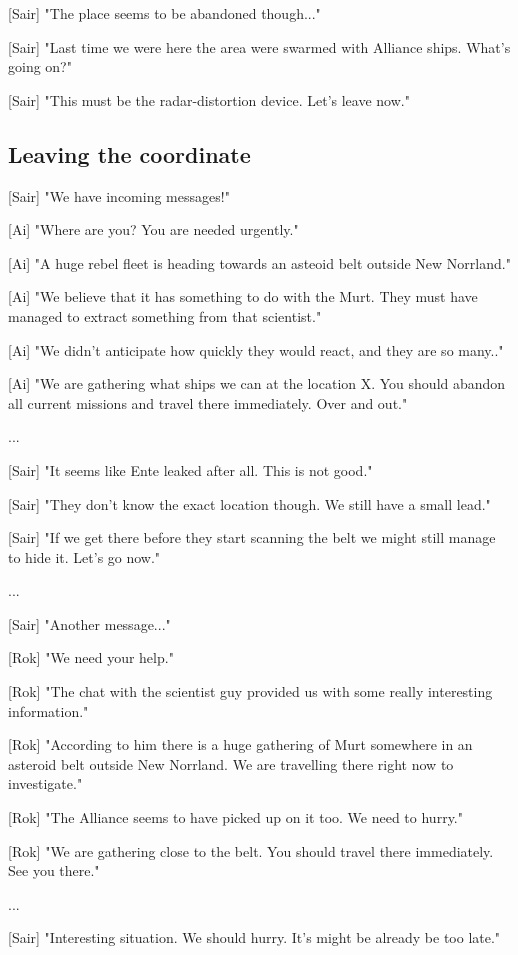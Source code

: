 \documentclass[a4paper,12pt]{article}
\begin{document}
[Sair] "The place seems to be abandoned though..."

[Sair] "Last time we were here the area were swarmed with Alliance ships. What's going on?"

[Sair] "This must be the radar-distortion device. Let's leave now."

\subsection{Leaving the coordinate}

[Sair] "We have incoming messages!"

[Ai] "Where are you? You are needed urgently."

[Ai] "A huge rebel fleet is heading towards an asteoid belt outside New Norrland." 

[Ai] "We believe that it has something to do with the Murt. They must have managed to extract something from that scientist." 

[Ai] "We didn't anticipate how quickly they would react, and they are so many.." 

[Ai] "We are gathering what ships we can at the location X. You should abandon all current missions and travel there
immediately. Over and out."

...

[Sair] "It seems like Ente leaked after all. This is not good."

[Sair] "They don't know the exact location though. We still have a small lead." 

[Sair] "If we get there before they start scanning the belt we might still manage to hide it. Let's go now."

...

[Sair] "Another message..."

[Rok] "We need your help." 

[Rok] "The chat with the scientist guy provided us with some really interesting information." 

[Rok] "According to him there is a huge gathering of Murt somewhere in an asteroid belt outside New Norrland. We are travelling there right now to investigate."

[Rok] "The Alliance seems to have picked up on it too. We need to hurry." 

[Rok] "We are gathering close to the belt. You should travel there immediately. See you there."

...

[Sair] "Interesting situation. We should hurry. It's might be already be too late."
\end{document}
